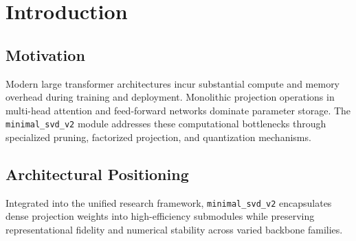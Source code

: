 \section{Introduction}

\subsection{Motivation}
Modern large transformer architectures incur substantial compute and memory overhead during training and deployment. Monolithic projection operations in multi-head attention and feed-forward networks dominate parameter storage. The \texttt{minimal_svd_v2} module addresses these computational bottlenecks through specialized pruning, factorized projection, and quantization mechanisms.

\subsection{Architectural Positioning}
Integrated into the unified research framework, \texttt{minimal_svd_v2} encapsulates dense projection weights into high-efficiency submodules while preserving representational fidelity and numerical stability across varied backbone families.
